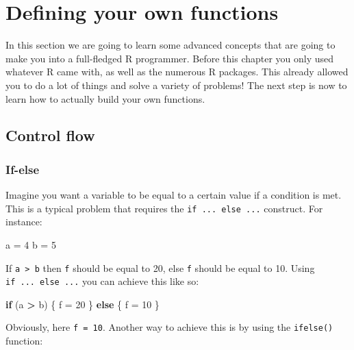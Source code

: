 \documentclass[]{gitbook}
\newenvironment{Shaded}{\begin{snugshade}}{\end{snugshade}}
\newcommand{\ControlFlowTok}[1]{\textcolor[rgb]{0.13,0.29,0.53}{\textbf{#1}}}
\newcommand{\DecValTok}[1]{\textcolor[rgb]{0.00,0.00,0.81}{#1}}
\newcommand{\NormalTok}[1]{#1}
\newcommand{\OperatorTok}[1]{\textcolor[rgb]{0.81,0.36,0.00}{\textbf{#1}}}
\newcommand{\StringTok}[1]{\textcolor[rgb]{0.31,0.60,0.02}{#1}}
\begin{document}
\hypertarget{defining-your-own-functions}{%
\section{Defining your own functions}\label{defining-your-own-functions}}

In this section we are going to learn some advanced concepts that are going to make you into a
full-fledged R programmer. Before this chapter you only used whatever R came with, as well as the
numerous R packages. This already allowed you to do a lot of things and solve a variety of problems!
The next step is now to learn how to actually build your own functions.

\hypertarget{control-flow}{%
\subsection{Control flow}\label{control-flow}}

\hypertarget{if-else}{%
\subsubsection{If-else}\label{if-else}}

Imagine you want a variable to be equal to a certain value if a condition is met. This is a typical
problem that requires the \texttt{if\ ...\ else\ ...} construct. For instance:

\begin{Shaded}
\begin{Highlighting}[]
\NormalTok{a =}\StringTok{ }\DecValTok{4}
\NormalTok{b =}\StringTok{ }\DecValTok{5}
\end{Highlighting}
\end{Shaded}

If \texttt{a\ \textgreater{}\ b} then \texttt{f} should be equal to 20, else \texttt{f} should be equal to 10. Using \texttt{if\ ...\ else\ ...} you can achieve this like so:

\begin{Shaded}
\begin{Highlighting}[]
\ControlFlowTok{if}\NormalTok{ (a }\OperatorTok{>}\StringTok{ }\NormalTok{b) \{}
\NormalTok{  f =}\StringTok{ }\DecValTok{20}
\NormalTok{    \} }\ControlFlowTok{else}\NormalTok{ \{}
\NormalTok{  f =}\StringTok{ }\DecValTok{10}
\NormalTok{\}}
\end{Highlighting}
\end{Shaded}

Obviously, here \texttt{f\ =\ 10}. Another way to achieve this is by using the \texttt{ifelse()} function:
\end{document}
